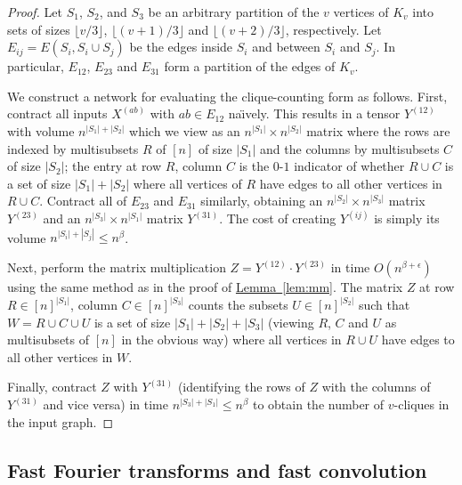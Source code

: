 \documentclass[11pt]{article}
\numberwithin{equation}{section}
\theoremstyle{definition}
\theoremstyle{plain}
\newcommand{\expref}[2]{\hyperref[#2]{#1~\ref{#2}}}
\begin{document}
\begin{proof}
  Let $S_1$, $S_2$, and $S_3$ be an arbitrary partition of the $v$
  vertices of $K_v$ into sets of sizes $\lfloor v/3 \rfloor$, $\lfloor
  (v+1)/3 \rfloor$ and $\lfloor (v+2)/3 \rfloor$, respectively.
  Let $E_{ij} = E(S_i, S_i \cup S_j)$ be the edges inside $S_i$ and
  between $S_i$ and $S_j$.  In particular, $E_{12}$, $E_{23}$ and $E_{31}$
  form a partition of the edges of $K_v$.

  We construct a network for evaluating the clique-counting form as
  follows.  First, contract all inputs $X^{(ab)}$ with $ab \in E_{12}$
  na\"\i{}vely.  This results in a tensor $Y^{(12)}$ with volume $n^{|S_1|
    + |S_2|}$ which we view as an $n^{|S_1|} \times n^{|S_2|}$ matrix
  where the rows are indexed by multisubsets $R$ of $[n]$ of size $|S_1|$
  and the columns by multisubsets $C$ of size $|S_2|$; the entry at
  row $R$, column $C$ is the $0$-$1$ indicator of whether $R \cup C$ is
  a set of size $|S_1|+|S_2|$ where all vertices of $R$ have edges to
  all other vertices in $R \cup C$.
  Contract all of $E_{23}$ and
  $E_{31}$ similarly, obtaining an $n^{|S_2|} \times n^{|S_3|}$ matrix
  $Y^{(23)}$ and an $n^{|S_3|} \times n^{|S_1|}$ matrix $Y^{(31)}$.
  The cost of creating $Y^{(ij)}$ is simply its volume $n^{|S_i|+|S_j|} \le n^{\beta}$.

  Next, perform the matrix multiplication $Z = Y^{(12)} \cdot Y^{(23)}$ in
  time $O(n^{\beta + \epsilon})$ using the same method as in the proof
  of \expref{Lemma}{lem:mm}.  The matrix $Z$ at row $R
  \in [n]^{|S_1|}$, column $C \in [n]^{|S_3|}$ counts the 
%
  subsets $U\in [n]^{|S_2|}$ such that $W = R \cup C \cup U$ is a set of
  size $|S_1| + |S_2| + |S_3|$ (viewing $R$, $C$ and $U$ as multisubsets of
  $[n]$ in the obvious way) where all vertices in $R \cup U$ have
  edges to all other vertices in $W$.

  Finally, contract $Z$ with $Y^{(31)}$ (identifying the rows of
  $Z$ with the columns of $Y^{(31)}$ and vice versa) in time $n^{|S_3|
    + |S_1|} \le n^{\beta}$ to obtain the number of $v$-cliques in the
  input graph.
\end{proof}





\subsection{Fast Fourier transforms and fast convolution}

\label{sect:fft}
\end{document}
